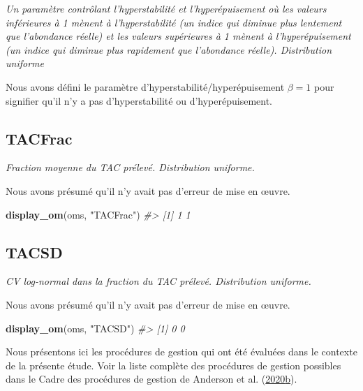 \documentclass[french,11pt]{book}
\newenvironment{Shaded}{\begin{snugshade}}{\end{snugshade}}
\newcommand{\CommentTok}[1]{\textcolor[rgb]{0.56,0.35,0.01}{\textit{#1}}}
\newcommand{\KeywordTok}[1]{\textcolor[rgb]{0.13,0.29,0.53}{\textbf{#1}}}
\newcommand{\NormalTok}[1]{#1}
\newcommand{\StringTok}[1]{\textcolor[rgb]{0.31,0.60,0.02}{#1}}
\begin{document}
\emph{Un paramètre contrôlant l'hyperstabilité et l'hyperépuisement où les valeurs inférieures à 1 mènent à l'hyperstabilité (un indice qui diminue plus lentement que l'abondance réelle) et les valeurs supérieures à 1 mènent à l'hyperépuisement (un indice qui diminue plus rapidement que l'abondance réelle). Distribution uniforme}

Nous avons défini le paramètre d'hyperstabilité/hyperépuisement \(\beta = 1\) pour signifier qu'il n'y a pas d'hyperstabilité ou d'hyperépuisement.

\label{app:desc-imp-yelloweye}

\subsection{TACFrac}
\label{app:desc-imp-tacfrac-yelloweye}

\emph{Fraction moyenne du TAC prélevé. Distribution uniforme.}

Nous avons présumé qu'il n'y avait pas d'erreur de mise en œuvre.
\begin{Shaded}
\begin{Highlighting}[]
\KeywordTok{display_om}\NormalTok{(oms, }\StringTok{"TACFrac"}\NormalTok{)}
\CommentTok{#> [1] 1 1}
\end{Highlighting}
\end{Shaded}
\subsection{TACSD}
\label{app:desc-imp-tacsd-yelloweye}

\emph{CV log-normal dans la fraction du TAC prélevé. Distribution uniforme.}

Nous avons présumé qu'il n'y avait pas d'erreur de mise en œuvre.
\begin{Shaded}
\begin{Highlighting}[]
\KeywordTok{display_om}\NormalTok{(oms, }\StringTok{"TACSD"}\NormalTok{)}
\CommentTok{#> [1] 0 0}
\end{Highlighting}
\end{Shaded}
\newpage


\clearpage

\label{app:mps}

Nous présentons ici les procédures de gestion qui ont été évaluées dans le contexte de la présente étude. Voir la liste complète des procédures de gestion possibles dans le Cadre des procédures de gestion de Anderson et al. (\protect\hyperlink{ref-anderson2020gfmp}{2020}\protect\hyperlink{ref-anderson2020gfmp}{b}).
\end{document}

